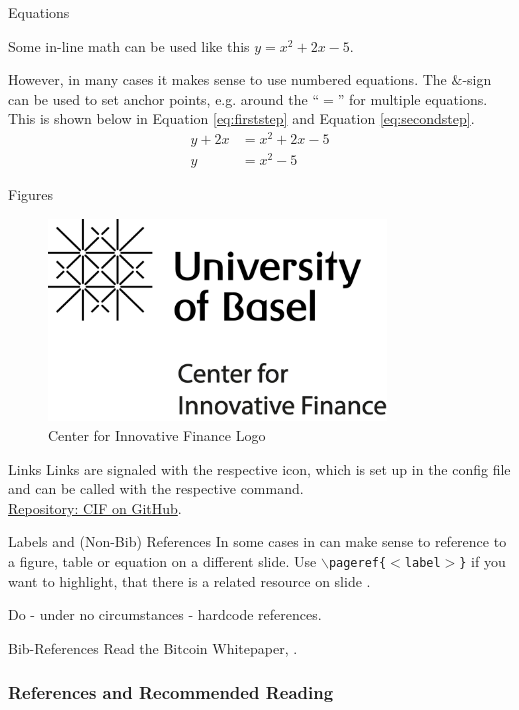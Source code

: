 \documentclass[]{beamer}
\begin{document}


\begin{frame}{Equations}

Some in-line math can be used like this $y=x^2+2x-5$. \\ \vspace{1em}

However, in many cases it makes sense to use numbered equations. The $\&$-sign can be used to set anchor points, e.g. around the ``$=$'' for multiple equations. This is shown below in Equation \eqref{eq:firststep} and Equation \eqref{eq:secondstep}.
	\begin{align}
		y + 2x &= x^2+2x-5 \label{eq:firststep}\\
		y &= x^2-5 \label{eq:secondstep}
	\end{align}
\end{frame}

\begin{frame}{Figures}
	\begin{figure}
		\center
		\includegraphics[width=0.8\textwidth]{../config/logo_cif}	
		\caption{Center for Innovative Finance Logo}
		\label{fig:logo}
	\end{figure}
\end{frame}

\begin{frame}{Links}
		Links are signaled with the respective icon, which is set up in the config file and can be called with the respective command.\\
		
		\link \href{https://github.com/cifunibas}{Repository: CIF on GitHub}.
		
\end{frame}


\begin{frame}{Labels and (Non-Bib) References}
	In some cases in can make sense to reference to a figure, table or equation on a different slide. Use \texttt{$\backslash$pageref\{$<$label$>$\}} if you want to highlight, that there is a related resource on slide \pageref{fig:logo}.\\ \vspace{1em}
	
	Do - under no circumstances - hardcode references.	
\end{frame}

\begin{frame}{Bib-References}
		Read the Bitcoin Whitepaper, \cite{nakamotoBitcoin2008}.
\end{frame}

\begin{frame}%
\frametitle{References and Recommended Reading}
	
	
\end{frame}
\end{document}
